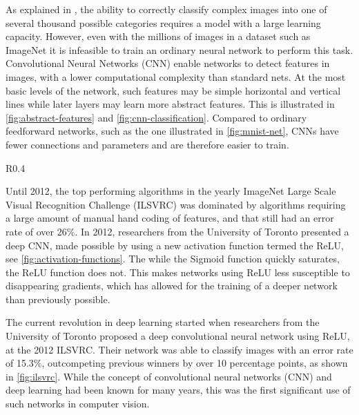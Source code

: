 \documentclass[\rootfolder/main.tex]{subfiles}
\begin{document}
As explained in \cite{Krizhevsky2012}, the ability to correctly classify complex images into one of several thousand possible categories requires a model with a large learning capacity.
However, even with the millions of images in a dataset such as ImageNet it is infeasible to train an ordinary neural network to perform this task.
Convolutional Neural Networks (CNN) enable networks to detect features in images, with a lower computational complexity than standard nets.
At the most basic levels of the network, such features may be simple horizontal and vertical lines while later layers may learn more abstract features.
This is illustrated in \cref{fig:abstract-features} and \cref{fig:cnn-classification}.
Compared to ordinary feedforward networks, such as the one illustrated in \cref{fig:mnist-net}, CNNs have fewer connections and parameters and are therefore easier to train.

\begin{wrapfigure}{R}{0.4\columnwidth}
    \caption{Illustration of Sigmoid and ReLU activation functions.\label{fig:activation-functions}}
\end{wrapfigure}

Until 2012, the top performing algorithms in the yearly ImageNet Large Scale Visual Recognition Challenge (ILSVRC) was dominated by algorithms requiring a large amount of manual hand coding of features, and that still had an error rate of over 26\%.
In 2012, researchers from the University of Toronto presented a deep CNN, made possible by using a new activation function termed the ReLU, see \cref{fig:activation-functions}.
The while the Sigmoid function quickly saturates, the ReLU function does not.
This makes networks using ReLU less susceptible to disappearing gradients, which has allowed for the training of a deeper network than previously possible\cite{Krizhevsky2012}.

The current revolution in deep learning started when researchers from the University of Toronto proposed a deep convolutional neural network using ReLU, at the 2012 ILSVRC.
Their network was able to classify images with an error rate of 15.3\%, outcompeting previous winners by over 10 percentage points, as shown in \cref{fig:ilsvrc}.
While the concept of convolutional neural networks (CNN) and deep learning had been known for many years, this was the first significant use of such networks in computer vision.
\end{document}
